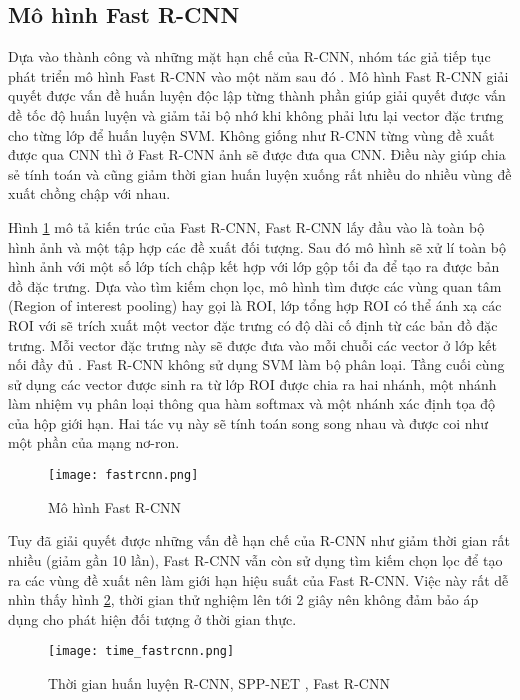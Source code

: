 \documentclass[../the.tex]{subfiles}
\begin{document}
\subsection{Mô hình Fast R-CNN}
{\fontsize{13}{12} \selectfont 
Dựa vào thành công và những mặt hạn chế của R-CNN, nhóm tác giả tiếp tục phát triển mô hình Fast R-CNN vào một năm sau đó \cite{girshick2015fast}. 
Mô hình Fast R-CNN giải quyết được vấn đề huấn luyện độc lập từng thành phần giúp giải quyết được vấn đề tốc độ huấn luyện và giảm tải bộ nhớ khi không phải lưu lại vector đặc trưng cho từng lớp để huấn luyện SVM.
Không giống như R-CNN từng vùng đề xuất được qua CNN thì ở Fast R-CNN ảnh sẽ được đưa qua CNN. Điều này giúp chia sẻ tính toán và cũng giảm thời gian huấn luyện xuống rất nhiều do nhiều vùng đề xuất chồng chập với nhau.

Hình \ref{fig:fastrcnn} mô tả kiến trúc của Fast R-CNN, Fast R-CNN lấy đầu vào là toàn bộ hình ảnh và một tập hợp các đề xuất đối tượng. Sau đó mô hình sẽ xử lí toàn bộ hình ảnh với một số lớp tích chập kết hợp với lớp gộp tối đa để tạo ra được bản đồ đặc trưng.
Dựa vào tìm kiếm chọn lọc, mô hình tìm được các vùng quan tâm (Region of interest pooling) hay gọi là ROI, lớp tổng hợp ROI có thể ánh xạ các ROI với sẽ trích xuất một vector đặc trưng có độ dài cố định từ các bản đồ đặc trưng. Mỗi vector đặc trưng này sẽ được đưa vào mỗi chuỗi các vector ở lớp kết nối đầy đủ \cite{girshick2015fast}.
Fast R-CNN không sử dụng SVM làm bộ phân loại. Tầng cuối cùng sử dụng các vector được sinh ra từ lớp ROI được chia ra hai nhánh, một nhánh làm nhiệm vụ phân loại thông qua hàm softmax và một nhánh xác định tọa độ của hộp giới hạn. Hai tác vụ này sẽ tính toán song song nhau và được coi như một phần của mạng nơ-ron.
}

\begin{figure}[H]
	\centering
	\texttt{[image: fastrcnn.png]}
	\caption{Mô hình Fast R-CNN \cite{girshick2015fast}}
	\label{fig:fastrcnn}
\end{figure}
\bigskip
{\fontsize{13}{12} \selectfont 
Tuy đã giải quyết được những vấn đề hạn chế của R-CNN như giảm thời gian rất nhiều (giảm gần 10 lần), Fast R-CNN vẫn còn sử dụng tìm kiếm chọn lọc để tạo ra các vùng đề xuất nên làm giới hạn hiệu suất của Fast R-CNN. Việc này rất dễ nhìn thấy hình \ref{fig:timefastrcnn},
thời gian thử nghiệm lên tới 2 giây nên không đảm bảo áp dụng cho phát hiện đối tượng ở thời gian thực.
}
\begin{figure}[H]
	\centering
	\texttt{[image: time\_fastrcnn.png]}
	\caption{Thời gian huấn luyện R-CNN, SPP-NET \cite{He_2014}, Fast R-CNN \cite{testtimefastrcnn}}
	\label{fig:timefastrcnn}
\end{figure}
\bigskip
\end{document}
